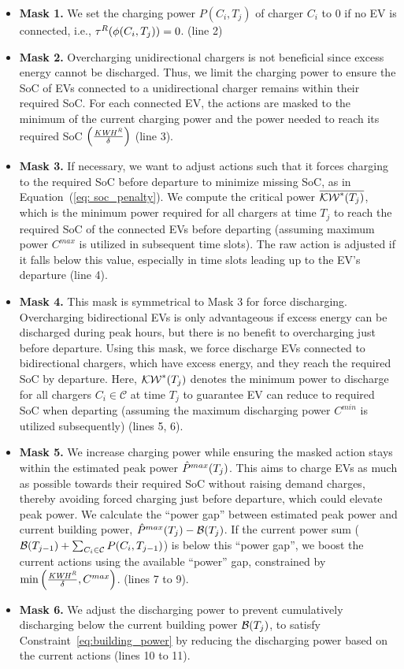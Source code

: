\begin{itemize}[leftmargin=*]
    \item \textbf{Mask 1.} 
    We set the charging power $P(C_i, T_j)$ of charger $C_i$ to 0 if no EV is connected, i.e., $\tau^R(\phi(C_i, T_j))=0$. (line 2)
     \item \textbf{Mask 2.} Overcharging unidirectional chargers is not beneficial since excess energy cannot be discharged. Thus, we limit the charging power to ensure the SoC of EVs connected to a unidirectional charger remains within their required SoC. 
    For each connected EV, the actions are masked to the minimum of the current charging power and the power needed to reach its required SoC $\left(\frac{{\it KWH^{R}}}{\delta}\right)$ (line 3). 
     
    \item \textbf{Mask 3.} 
    If necessary, we want to adjust actions such that it forces charging to the required SoC before departure to minimize missing SoC, as in Equation~(\ref{eq: soc_penalty}).
    We compute the critical power $\overline{\mathcal{KW}^*(T_j)}$, which is the minimum power required for all chargers at time $T_j$ to reach the required SoC of the connected EVs before departing (assuming maximum power $C^{max}$ is utilized in subsequent time slots). The raw action is adjusted if it falls below this value, especially in time slots leading up to the EV's departure (line 4).    
    \item \textbf{Mask 4.} 
    This mask is symmetrical to Mask 3 for force discharging.
    Overcharging bidirectional EVs is only advantageous if excess energy can be discharged during peak hours, but there is no benefit to overcharging just before departure. Using this mask, we force discharge EVs connected to bidirectional chargers, which have excess energy, and they reach the required SoC by departure.  Here, $\mathcal{KW}^*(T_j)$ denotes the minimum power to discharge for all chargers $C_i \in \mathcal{C}$ at time $T_j$ to guarantee EV can reduce to required SoC when departing (assuming the maximum discharging power $C^{min}$ is utilized subsequently) (lines 5, 6).    
    \item \textbf{Mask 5.} 
    We increase charging power while ensuring the masked action stays within the estimated peak power $\hat{P}^{max}(T_{j})$. This aims to charge EVs as much as possible towards their required SoC without raising demand charges, thereby avoiding forced charging just before departure, which could elevate peak power. 
    We calculate the ``power gap'' between estimated peak power and current building power, $\hat{P}^{max}(T_j) - \mathcal{B}(T_j)$. If the current power sum ($\mathcal{B}(T_{j-1}) + \sum_{C_i \in \mathcal{C}} P(C_i, T_{j-1})$) is below this ``power gap'', we boost the current actions using the available ``power'' gap, constrained by $\min \left(\frac{{\it KWH^{R}}}{\delta}, C^{max}\right)$. (lines 7 to 9). 
    \item \textbf{Mask 6.} We adjust the discharging power to prevent cumulatively discharging below the current building power $\mathcal{B}(T_j)$, to satisfy Constraint~\ref{eq:building_power} by reducing the discharging power based on the current actions (lines 10 to 11).
\end{itemize} 
